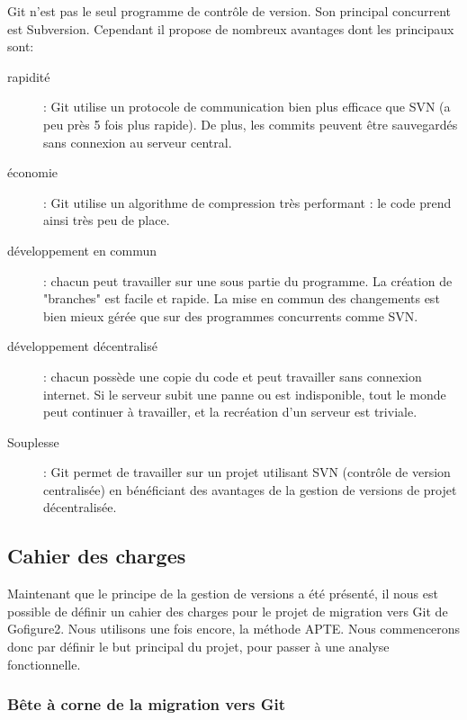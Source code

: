 Git n'est pas le seul programme de contrôle de version. Son principal concurrent est Subversion.
Cependant il propose de nombreux avantages dont les principaux sont:
\begin{description}
  \item[rapidité] : Git utilise un protocole de communication bien plus efficace que SVN (a peu près 5 fois plus rapide). 
  De plus, les commits peuvent être sauvegardés sans connexion au serveur central.
  \item[économie] : Git utilise un algorithme de compression très performant : le code prend ainsi très peu de place.
  \item[développement en commun] : chacun peut travailler sur une sous partie du programme. La création de "branches" est facile et
  rapide. La mise en commun des changements est bien mieux gérée que sur des programmes concurrents comme SVN.
  \item[développement décentralisé] : chacun possède une copie du code et peut travailler sans connexion internet. 
  Si le serveur subit une panne ou est indisponible, tout le monde peut continuer à travailler, et la recréation d'un serveur est triviale.
  \item[Souplesse] : Git permet de travailler sur un projet utilisant SVN (contrôle de version centralisée)
  en bénéficiant des avantages de la gestion de versions de projet décentralisée.
\end{description}

\subsection{Cahier des charges}

Maintenant que le principe de la gestion de versions a été présenté,
il nous est possible de définir un cahier des charges
pour le projet de migration vers Git de Gofigure2.
Nous utilisons une fois encore, la méthode {APTE\textregistered}.
Nous commencerons donc par définir le but principal du projet, pour passer à une analyse fonctionnelle.

\subsubsection*{Bête à corne de la migration vers Git}

